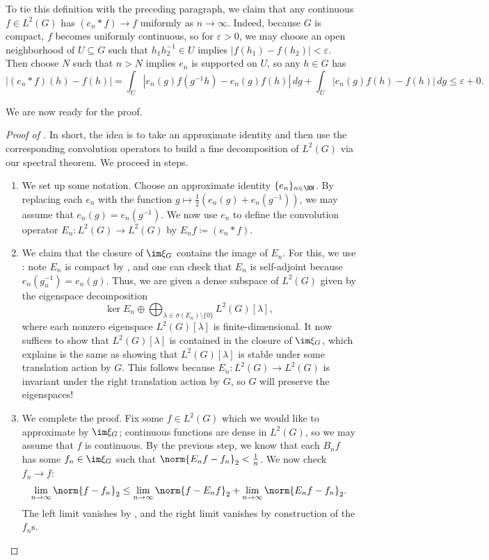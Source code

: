 \documentclass[notes.tex]{subfiles}
\begin{document}
\begin{remark} \label{rem:approx-id-uniform}
	To tie this definition with the preceding paragraph, we claim that any continuous $f\in L^2(G)$ has $(e_n*f)\to f$ uniformly as $n\to\infty$. Indeed, because $G$ is compact, $f$ becomes uniformly continuous, so for $\varepsilon>0$, we may choose an open neighborhood of $U\subseteq G$ such that $h_1h_2^{-1}\in U$ implies $\left|f(h_1)-f(h_2)\right|<\varepsilon$. Then choose $N$ such that $n>N$ implies $e_n$ is supported on $U$, so any $h\in G$ has
	\[\left|(e_n*f)(h)-f(h)\right|=\int_U\left|e_n(g)f\left(g^{-1}h\right)-e_n(g)f(h)\right|\,dg+\int_U\left|e_n(g)f(h)-f(h)\right|\,dg\le\varepsilon+0.\]
\end{remark}
We are now ready for the proof.
\begin{proof}[Proof of ]
	In short, the idea is to take an approximate identity and then use the corresponding convolution operators to build a fine decomposition of $L^2(G)$ via our spectral theorem.
	We proceed in steps.
	\begin{enumerate}
		\item We set up some notation. Choose an approximate identity $\{e_n\}_{n\in\NN}$. By replacing each $e_n$ with the function $g\mapsto\frac12\left(e_n(g)+e_n(g^{-1})\right)$, we may assume that $e_n(g)=e_n\left(g^{-1}\right)$. We now use $e_n$ to define the convolution operator $E_n\colon L^2(G)\to L^2(G)$ by $E_nf\coloneqq(e_n*f)$.
		\item We claim that the closure of $\im\xi_G$ contains the image of $E_n$. For this, we use : note $E_n$ is compact by , and one can check that $E_n$ is self-adjoint because $e_n\left(g_n^{-1}\right)=e_n(g)$. Thus, we are given a dense subspace of $L^2(G)$ given by the eigenspace decomposition
		\[\ker E_n\oplus\bigoplus_{\lambda\in\sigma(E_n)\setminus\{0\}}L^2(G)[\lambda],\]
		where each nonzero eigenspace $L^2(G)[\lambda]$ is finite-dimensional. It now suffices to show that $L^2(G)[\lambda]$ is contained in the closure of $\im\xi_G$, which  explains is the same as showing that $L^2(G)[\lambda]$ is stable under some translation action by $G$. This follows because $E_n\colon L^2(G)\to L^2(G)$ is invariant under the right translation action by $G$, so $G$ will preserve the eigenspaces!
		\item We complete the proof. Fix some $f\in L^2(G)$ which we would like to approximate by $\im\xi_G$; continuous functions are dense in $L^2(G)$, so we may assume that $f$ is continuous. By the previous step, we know that each $B_nf$ has some $f_n\in\im\xi_G$ such that $\norm{E_nf-f_n}_2<\frac1n$. We now check $f_n\to f$:
		\[\lim_{n\to\infty}\norm{f-f_n}_2\le\lim_{n\to\infty}\norm{f-E_nf}_2+\lim_{n\to\infty}\norm{E_nf-f_n}_2.\]
		The left limit vanishes by , and the right limit vanishes by construction of the $f_n$s.
		\qedhere
	\end{enumerate}
\end{proof}
\end{document}
